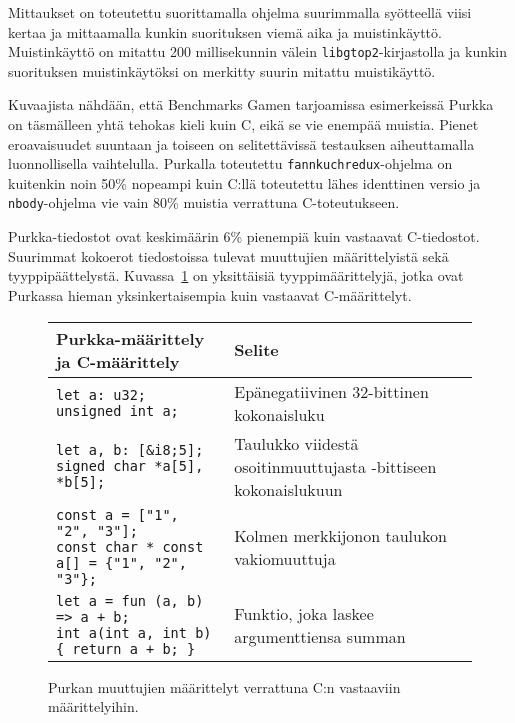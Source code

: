 Mittaukset on toteutettu suorittamalla ohjelma suurimmalla syötteellä viisi
kertaa ja mittaamalla kunkin suorituksen viemä aika ja muistinkäyttö.
Muistinkäyttö on mitattu 200 millisekunnin välein \texttt{libgtop2}-kirjastolla
ja kunkin suorituksen muistinkäytöksi on merkitty suurin mitattu muistikäyttö.

Kuvaajista nähdään, että Benchmarks Gamen tarjoamissa esimerkeissä Purkka on
täsmälleen yhtä tehokas kieli kuin C, eikä se vie enempää muistia. Pienet
eroavaisuudet suuntaan ja toiseen on selitettävissä testauksen aiheuttamalla
luonnollisella vaihtelulla. Purkalla toteutettu \texttt{fannkuchredux}-ohjelma
on kuitenkin noin 50\% nopeampi kuin C:llä toteutettu lähes identtinen versio
ja \texttt{nbody}-ohjelma vie vain 80\% muistia verrattuna C-toteutukseen.

Purkka-tiedostot ovat keskimäärin 6\% pienempiä kuin vastaavat C-tiedostot.
Suurimmat kokoerot tiedostoissa tulevat muuttujien määrittelyistä sekä
tyyppipäättelystä. Kuvassa~\ref{fig:declarations} on yksittäisiä
tyyppimäärittelyjä, jotka ovat Purkassa hieman yksinkertaisempia kuin vastaavat
C-määrittelyt.

\begin{figure}[ht!]
    \begin{adjustbox}{center}
        \begin{tabular}{@{} m{} m{} @{}} \toprule
            Purkka-määrittely ja C-määrittely & Selite \\ \midrule

            \texttt{let a: u32; \newline unsigned int a;} & Epänegatiivinen 32-bittinen kokonaisluku \\
            \noalign{\vspace{0.3cm}}

            \texttt{let a, b: [\&i8;5]; \newline signed char *a[5], *b[5];} & Taulukko viidestä osoitinmuuttujasta \newline 8-bittiseen kokonaislukuun \\
            \noalign{\vspace{0.3cm}}

            \texttt{const a = ["1", "2", "3"]; \newline const char * const a[] = \{"1", "2", "3"\};} & Kolmen merkkijonon taulukon vakiomuuttuja \\
            \noalign{\vspace{0.3cm}}

            \texttt{let a = fun (a, b) => a + b; \newline int a(int a, int b) \{ return a + b; \}} & Funktio, joka laskee argumenttiensa summan \\ \bottomrule
        \end{tabular}
    \end{adjustbox}
    \label{fig:declarations}
    \caption{Purkan muuttujien määrittelyt verrattuna C:n vastaaviin
    määrittelyihin.}
\end{figure}

